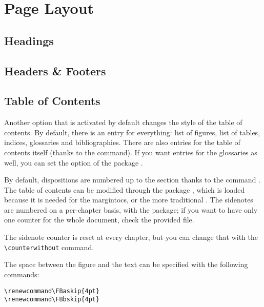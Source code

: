 \setchapterpreamble[u]{\margintoc[*-6]}
\chapter{Page Layout}

\section{Headings}

\blindtext

\section{Headers \& Footers}

\blindtext

\section{Table of Contents}

Another option that is activated by default changes the style of the 
table of contents. By default, there is an entry for everything: list of 
figures, list of tables, indices, glossaries and bibliographies. There 
are also entries for the table of contents itself (thanks to the 
 command). If you want entries for the 
glossaries as well, you can set the  option of the package 
.

By default, dispositions are numbered up to the section thanks to the 
command . The table of contents 
can be modified through the package , which is loaded 
because it is needed for the margintocs, or the more traditional 
. The sidenotes are numbered on a per-chapter basis, 
with the  package; if you want to have only one 
counter for the whole document, check the provided  
file.


The sidenote counter is reset at every chapter, but you can change that 
with the \verb|\counterwithout| command.

 The space between the figure and the text can be specified with the 
following commands:

\begin{lstlisting}[style=kaolstplain]
\renewcommand\FBaskip{4pt}
\renewcommand\FBbskip{4pt}
\end{lstlisting}

